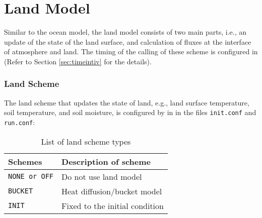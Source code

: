 \section{Land Model} \label{sec:basic_usel_land}
Similar to the ocean model, the land model consists of two main parts, i.e., an update of the state of the land surface, and calculation of fluxes at the interface of atmosphere and land. The timing of the calling of these scheme is configured in  (Refer to Section \ref{sec:timeintiv} for the details).

\subsubsection{Land Scheme}
The land scheme that updates the state of land, e.g., land surface temperature, soil temperature, and soil moisture, is configured by  in  in the files \verb|init.conf| and \verb|run.conf|:
%

\begin{table}[hbt]
\begin{center}
  \caption{List of land scheme types}
  \label{tab:nml_land_dyn}
  \begin{tabularx}{150mm}{lX} \hline
    \rowcolor[gray]{0.9}  Schemes & Description of scheme \\ \hline
      \verb|NONE or OFF| & Do not use land model \\
      \verb|BUCKET|      & Heat diffusion/bucket model \\
      \verb|INIT|        & Fixed to the initial condition \\
    \hline
  \end{tabularx}
\end{center}
\end{table}


